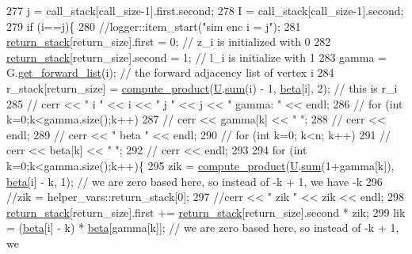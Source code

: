 \begin{DoxyCode}
277     j = call\_stack[call\_size-1].first.second;
278     I = call\_stack[call\_size-1].second;
279     \textcolor{keywordflow}{if} (i==j)\{
280       \textcolor{comment}{//logger::item\_start("sim enc i = j");}
281       \hyperlink{namespacehelper__vars_a6d2100c373830cacd232319a9958652d}{return\_stack}[return\_size].first = 0; \textcolor{comment}{// z\_i is initialized with 0}
282       \hyperlink{namespacehelper__vars_a6d2100c373830cacd232319a9958652d}{return\_stack}[return\_size].second = 1; \textcolor{comment}{// l\_i is initialize with 1}
283       gamma = G.\hyperlink{classgraph_aa8fbee52a7b3604dbbd9175040c7ead5}{get\_forward\_list}(i); \textcolor{comment}{// the forward adjacency list of vertex i}
284       r\_stack[return\_size] = \hyperlink{compression__helper_8cpp_ae2afb43aabe50f7d42aae8f82b5a35f4}{compute\_product}(\hyperlink{classgraph__encoder_a3314c40920f2ee132958a6b0ce7e7995}{U}.\hyperlink{classreverse__fenwick__tree_a672731fd6395b4853430073a099a80e6}{sum}(i) - 1, 
      \hyperlink{classgraph__encoder_a40880adecfd63fb86e94b4b0fc3f6bc2}{beta}[i], 2); \textcolor{comment}{// this is r\_i}
285       \textcolor{comment}{// cerr << " i " << i << " j " << j << " gamma: " << endl;}
286       \textcolor{comment}{// for (int k=0;k<gamma.size();k++)}
287       \textcolor{comment}{//   cerr << gamma[k] << " ";}
288       \textcolor{comment}{// cerr << endl;}
289       \textcolor{comment}{// cerr << " beta " << endl;}
290       \textcolor{comment}{// for (int k=0; k<n; k++)}
291       \textcolor{comment}{//   cerr << beta[k] << " ";}
292       \textcolor{comment}{// cerr << endl;}
293 
294       \textcolor{keywordflow}{for} (\textcolor{keywordtype}{int} k=0;k<gamma.size();k++)\{
295         zik = \hyperlink{compression__helper_8cpp_ae2afb43aabe50f7d42aae8f82b5a35f4}{compute\_product}(\hyperlink{classgraph__encoder_a3314c40920f2ee132958a6b0ce7e7995}{U}.\hyperlink{classreverse__fenwick__tree_a672731fd6395b4853430073a099a80e6}{sum}(1+gamma[k]), \hyperlink{classgraph__encoder_a40880adecfd63fb86e94b4b0fc3f6bc2}{beta}[i] - k, 1); \textcolor{comment}{// we are zero
       based here, so instead of -k + 1, we have -k}
296         \textcolor{comment}{//zik = helper\_vars::return\_stack[0];}
297         \textcolor{comment}{//cerr << " zik " << zik << endl;}
298         \hyperlink{namespacehelper__vars_a6d2100c373830cacd232319a9958652d}{return\_stack}[return\_size].first += \hyperlink{namespacehelper__vars_a6d2100c373830cacd232319a9958652d}{return\_stack}[return\_size].second * zik;
299         lik = (\hyperlink{classgraph__encoder_a40880adecfd63fb86e94b4b0fc3f6bc2}{beta}[i] - k) * \hyperlink{classgraph__encoder_a40880adecfd63fb86e94b4b0fc3f6bc2}{beta}[gamma[k]]; \textcolor{comment}{// we are zero based here, so instead of -k + 1, we
}
\end{DoxyCode}
